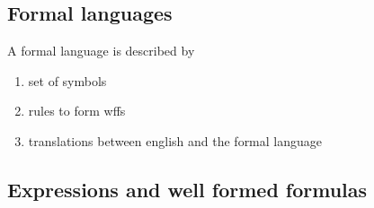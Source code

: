 \documentclass[../../main.tex]{subfiles}
\begin{document}
\subsection{Formal languages}

\begin{definition}
    A formal language is described by
    \begin{enumerate}
        \item set of symbols
        \item rules to form wffs
        \item translations between english and the formal language
    \end{enumerate}
\end{definition}


\subsection{Expressions and well formed formulas}
\end{document}
